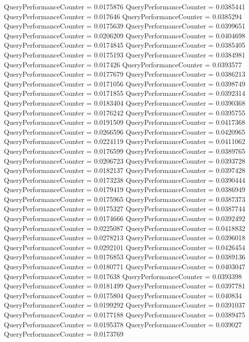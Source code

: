 \documentclass[9pt]{article}
\theoremstyle{plain}
\theoremstyle{definition}
\theoremstyle{remark}
\numberwithin{equation}{section}
\begin{document}
QueryPerformanceCounter  =  0.0175876
QueryPerformanceCounter  =  0.0385441
QueryPerformanceCounter  =  0.017646
QueryPerformanceCounter  =  0.0385294
QueryPerformanceCounter  =  0.0175639
QueryPerformanceCounter  =  0.0399651
QueryPerformanceCounter  =  0.0206209
QueryPerformanceCounter  =  0.0404698
QueryPerformanceCounter  =  0.0174845
QueryPerformanceCounter  =  0.0385405
QueryPerformanceCounter  =  0.0175193
QueryPerformanceCounter  =  0.0384981
QueryPerformanceCounter  =  0.017426
QueryPerformanceCounter  =  0.0393577
QueryPerformanceCounter  =  0.0177679
QueryPerformanceCounter  =  0.0386213
QueryPerformanceCounter  =  0.0171056
QueryPerformanceCounter  =  0.0398749
QueryPerformanceCounter  =  0.0171855
QueryPerformanceCounter  =  0.0392314
QueryPerformanceCounter  =  0.0183404
QueryPerformanceCounter  =  0.0390368
QueryPerformanceCounter  =  0.0176242
QueryPerformanceCounter  =  0.0395755
QueryPerformanceCounter  =  0.0191509
QueryPerformanceCounter  =  0.0417368
QueryPerformanceCounter  =  0.0266596
QueryPerformanceCounter  =  0.0420965
QueryPerformanceCounter  =  0.0224119
QueryPerformanceCounter  =  0.0411062
QueryPerformanceCounter  =  0.0176599
QueryPerformanceCounter  =  0.0389765
QueryPerformanceCounter  =  0.0206723
QueryPerformanceCounter  =  0.0393728
QueryPerformanceCounter  =  0.0182137
QueryPerformanceCounter  =  0.0397428
QueryPerformanceCounter  =  0.0173238
QueryPerformanceCounter  =  0.0390444
QueryPerformanceCounter  =  0.0179419
QueryPerformanceCounter  =  0.0386949
QueryPerformanceCounter  =  0.0175965
QueryPerformanceCounter  =  0.0387373
QueryPerformanceCounter  =  0.0175327
QueryPerformanceCounter  =  0.0387744
QueryPerformanceCounter  =  0.0174666
QueryPerformanceCounter  =  0.0392492
QueryPerformanceCounter  =  0.0225087
QueryPerformanceCounter  =  0.0418832
QueryPerformanceCounter  =  0.0278213
QueryPerformanceCounter  =  0.0396018
QueryPerformanceCounter  =  0.0292101
QueryPerformanceCounter  =  0.0426454
QueryPerformanceCounter  =  0.0176853
QueryPerformanceCounter  =  0.0389136
QueryPerformanceCounter  =  0.0180771
QueryPerformanceCounter  =  0.0403047
QueryPerformanceCounter  =  0.017638
QueryPerformanceCounter  =  0.0393398
QueryPerformanceCounter  =  0.0181499
QueryPerformanceCounter  =  0.0397781
QueryPerformanceCounter  =  0.0175804
QueryPerformanceCounter  =  0.040834
QueryPerformanceCounter  =  0.0199292
QueryPerformanceCounter  =  0.0391037
QueryPerformanceCounter  =  0.0177188
QueryPerformanceCounter  =  0.0389475
QueryPerformanceCounter  =  0.0195378
QueryPerformanceCounter  =  0.039027
QueryPerformanceCounter  =  0.0173769
\end{document}
